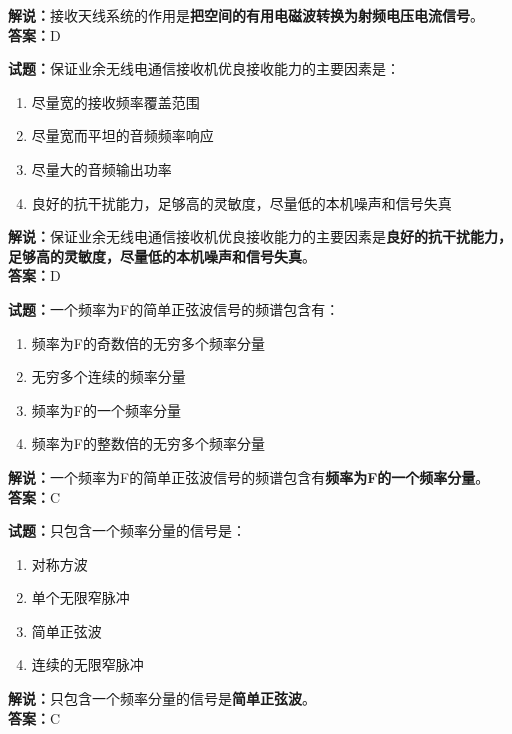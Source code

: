 \documentclass{ctexbook}
\begin{document}
\noindent\textbf{解说：}接收天线系统的作用是\textbf{把空间的有用电磁波转换为射频电压电流信号}。\\\noindent\textbf{答案：}D%


\bigskip


\noindent\textbf{试题：}保证业余无线电通信接收机优良接收能力的主要因素是：

\begin{enumerate}[leftmargin=3em]
	\item 尽量宽的接收频率覆盖范围
	\item 尽量宽而平坦的音频频率响应
	\item 尽量大的音频输出功率
	\item 良好的抗干扰能力，足够高的灵敏度，尽量低的本机噪声和信号失真
\end{enumerate}

\noindent\textbf{解说：}保证业余无线电通信接收机优良接收能力的主要因素是\textbf{良好的抗干扰能力，足够高的灵敏度，尽量低的本机噪声和信号失真}。\\\noindent\textbf{答案：}D%


\bigskip


\noindent\textbf{试题：}一个频率为F的简单正弦波信号的频谱包含有：

\begin{enumerate}[leftmargin=3em]
	\item 频率为F的奇数倍的无穷多个频率分量
	\item 无穷多个连续的频率分量
	\item 频率为F的一个频率分量
	\item 频率为F的整数倍的无穷多个频率分量
\end{enumerate}

\noindent\textbf{解说：}一个频率为F的简单正弦波信号的频谱包含有\textbf{频率为F的一个频率分量}。\\\noindent\textbf{答案：}C%


\bigskip


\noindent\textbf{试题：}只包含一个频率分量的信号是：
\begin{enumerate}[leftmargin=3em]
	\item 对称方波
	\item 单个无限窄脉冲
	\item 简单正弦波
	\item 连续的无限窄脉冲
\end{enumerate}

\noindent\textbf{解说：}只包含一个频率分量的信号是\textbf{简单正弦波}。\\\noindent\textbf{答案：}C%
\end{document}
